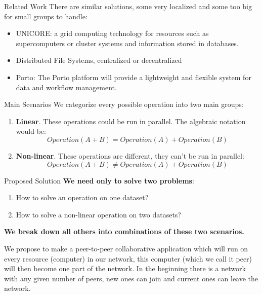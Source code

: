 \documentclass[final,hyperref={pdfpagelabels=true}]{beamer}
\begin{document}
\begin{frame}
\begin{columns}[t]
\begin{column}{.45\textwidth}
      \begin{block}{Related Work}
        There are similar solutions, some very localized and some too big for small groups to handle:
        \begin{itemize}
        \item UNICORE: a grid computing technology for resources such as supercomputers or cluster systems and information stored in databases.
        \item Distributed File Systems, centralized or decentralized
        \item Porto: The Porto platform will provide a lightweight and flexible system for data and workflow management.
        \end{itemize}
      \end{block}


      \begin{block}{Main Scenarios}
      We categorize every possible operation into two main groups:
      \begin{enumerate}
      \item \textbf{Linear}. These operations could be run in parallel. The algebraic notation would be:
      \[ Operation(A + B) = Operation(A) + Operation(B) \]
      \item \textbf{Non-linear}. These operations are different, they can't be run in parallel:
      \[ Operation(A + B) \neq Operation(A) + Operation(B) \]
      \end{enumerate}
      \end{block}

      \begin{block}{Proposed Solution}
      \textbf{We need only to solve two problems}:
      \begin{enumerate}
      \item How to solve an operation on one dataset?
      \item How to solve a non-linear operation on two datasets?
      \end{enumerate}
      \textbf{We break down all others into combinations of these two scenarios.}
      
      We propose to make a peer-to-peer collaborative application which will run on every resource 
      (computer) in our network, this computer (which we call it peer) will then become one part of 
      the network. In the beginning there is a network with any given number of peers,
      new ones can join and current ones can leave the network.
      

\end{block}
\end{column}
\end{columns}
\end{frame}
\end{document}
